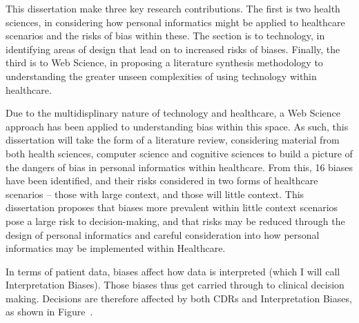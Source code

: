   This dissertation make three key research contributions. The first is two health sciences, in considering how personal informatics might be applied to healthcare scenarios and the risks of bias within these. The section is to technology, in identifying areas of design that lead on to increased risks of biases. Finally, the third is to Web Science, in proposing a literature synthesis methodology to understanding the greater unseen complexities of using technology within healthcare.

 Due to the multidisplinary nature of technology and healthcare, a Web Science approach has been applied to understanding bias within this space. As such, this dissertation will take the form of a literature review, considering material from both health sciences, computer science and cognitive sciences to build a picture of the dangers of bias in personal informatics within healthcare. From this, 16 biases have been identified, and their risks considered in two forms of healthcare scenarios -- those with large context, and those will little context. This dissertation proposes that biases more prevalent within little context scenarios pose a large risk to decision-making, and that risks may be reduced through the design of personal informatics and careful consideration into how personal informatics may be implemented within Healthcare.



      In terms of patient data, biases affect how data is interpreted (which I will call Interpretation Biases). Those biases thus get carried through to clinical decision making. Decisions are therefore affected by both CDRs and Interpretation Biases, as shown in Figure~\label{fig:clinicdata}.





